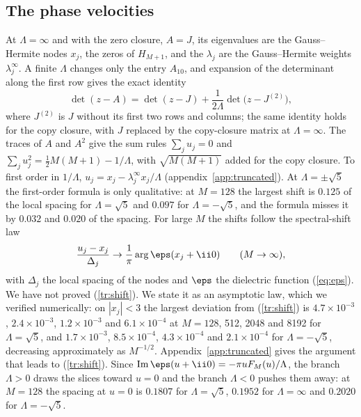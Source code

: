 \subsection{The phase velocities}\label{tr:velsec}

At $\Lambda=\infty$ and with the zero closure, $A=J$, its eigenvalues are the Gauss--Hermite nodes $x_j$, the zeros of $H_{M+1}$, and the $\lambda_j$ are the Gauss--Hermite weights $\lambda^\infty_j$. A finite $\Lambda$ changes only the entry $A_{10}$, and expansion of the determinant along the first row gives the exact identity
\begin{equation}\label{tr:det}
  \det(z-A)=\det(z-J)+\frac{1}{2\Lambda}\det\big(z-J^{(2)}\big),
\end{equation}
where $J^{(2)}$ is $J$ without its first two rows and columns; the same identity holds for the copy closure, with $J$ replaced by the copy-closure matrix at $\Lambda=\infty$. The traces of $A$ and $A^2$ give the sum rules $\sum_ju_j=0$ and $\sum_ju_j^2=\frac12M(M+1)-1/\Lambda$, with $\sqrt{M(M+1)}$ added for the copy closure. To first order in $1/\Lambda$, $u_j=x_j-\lambda^\infty_jx_j/\Lambda$ (appendix~\ref{app:truncated}). At $\Lambda=\pm\sqrt5$ the first-order formula is only qualitative: at $M=128$ the largest shift is $0.125$ of the local spacing for $\Lambda=\sqrt5$ and $0.097$ for $\Lambda=-\sqrt5$, and the formula misses it by $0.032$ and $0.020$ of the spacing. For large $M$ the shifts follow the spectral-shift law
\begin{equation}\label{tr:shift}
  \frac{u_j-x_j}{\Delta_j}\to\frac{1}{\pi}\arg\eps(x_j+\ii0)\qquad(M\to\infty),
\end{equation}
with $\Delta_j$ the local spacing of the nodes and $\eps$ the dielectric function (\ref{eq:eps}). We have not proved (\ref{tr:shift}). We state it as an asymptotic law, which we verified numerically: on $|x_j|<3$ the largest deviation from (\ref{tr:shift}) is $4.7\times10^{-3}$, $2.4\times10^{-3}$, $1.2\times10^{-3}$ and $6.1\times10^{-4}$ at $M=128$, 512, 2048 and 8192 for $\Lambda=\sqrt5$, and $1.7\times10^{-3}$, $8.5\times10^{-4}$, $4.3\times10^{-4}$ and $2.1\times10^{-4}$ for $\Lambda=-\sqrt5$, decreasing approximately as $M^{-1/2}$. Appendix~\ref{app:truncated} gives the argument that leads to (\ref{tr:shift}). Since $\mathrm{Im}\,\eps(u+\ii0)=-\pi uF_M(u)/\Lambda$, the branch $\Lambda>0$ draws the slices toward $u=0$ and the branch $\Lambda<0$ pushes them away: at $M=128$ the spacing at $u=0$ is $0.1807$ for $\Lambda=\sqrt5$, $0.1952$ for $\Lambda=\infty$ and $0.2020$ for $\Lambda=-\sqrt5$.

